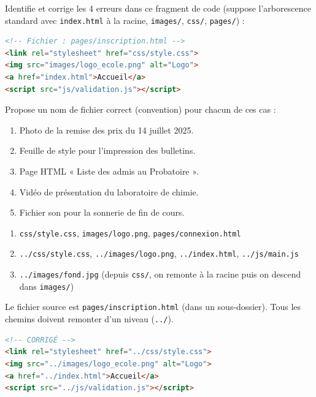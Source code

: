 \documentclass[11pt]{article}
\begin{document}
\begin{exercice}
Identifie et corrige les 4 erreurs dans ce fragment de code (suppose l'arborescence standard avec \texttt{index.html} à la racine, \texttt{images/}, \texttt{css/}, \texttt{pages/}) :
\begin{lstlisting}[language=HTML]
<!-- Fichier : pages/inscription.html -->
<link rel="stylesheet" href="css/style.css">
<img src="images/logo_ecole.png" alt="Logo">
<a href="index.html">Accueil</a>
<script src="js/validation.js"></script>
\end{lstlisting}
\end{exercice}

\begin{exercice}[Nommage]
Propose un nom de fichier correct (convention) pour chacun de ces cas :
\begin{enumerate}
    \item Photo de la remise des prix du 14 juillet 2025.
    \item Feuille de style pour l'impression des bulletins.
    \item Page HTML « Liste des admis au Probatoire ».
    \item Vidéo de présentation du laboratoire de chimie.
    \item Fichier son pour la sonnerie de fin de cours.
\end{enumerate}
\end{exercice}

\begin{corrige}[Exercice 1]
\begin{enumerate}
    \item \texttt{css/style.css}, \texttt{images/logo.png}, \texttt{pages/connexion.html}
    \item \texttt{../css/style.css}, \texttt{../images/logo.png}, \texttt{../index.html}, \texttt{../js/main.js}
    \item \texttt{../images/fond.jpg} (depuis \texttt{css/}, on remonte à la racine puis on descend dans \texttt{images/})
\end{enumerate}
\end{corrige}

\begin{corrige}[Exercice 2]
Le fichier source est \texttt{pages/inscription.html} (dans un sous-dossier). Tous les chemins doivent remonter d'un niveau (\texttt{../}).
\begin{lstlisting}[language=HTML]
<!-- CORRIGÉ -->
<link rel="stylesheet" href="../css/style.css">
<img src="../images/logo_ecole.png" alt="Logo">
<a href="../index.html">Accueil</a>
<script src="../js/validation.js"></script>
\end{lstlisting}
\end{corrige}
\end{document}

